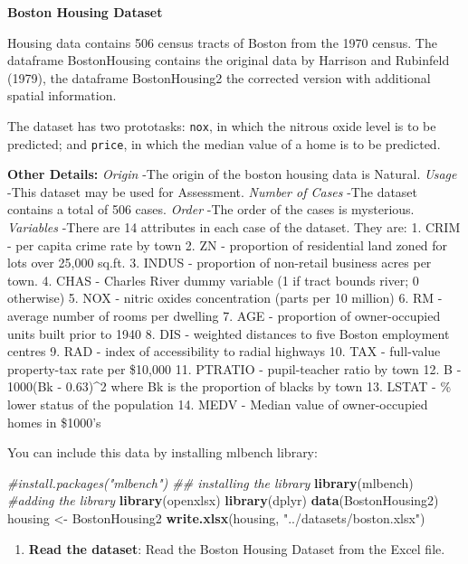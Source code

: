 \documentclass[
]{book}
\newenvironment{Shaded}{\begin{snugshade}}{\end{snugshade}}
\newcommand{\CommentTok}[1]{\textcolor[rgb]{0.56,0.35,0.01}{\textit{#1}}}
\newcommand{\FunctionTok}[1]{\textcolor[rgb]{0.13,0.29,0.53}{\textbf{#1}}}
\newcommand{\NormalTok}[1]{#1}
\newcommand{\OtherTok}[1]{\textcolor[rgb]{0.56,0.35,0.01}{#1}}
\newcommand{\StringTok}[1]{\textcolor[rgb]{0.31,0.60,0.02}{#1}}
\providecommand{\tightlist}{%
  \setlength{\itemsep}{0pt}\setlength{\parskip}{0pt}}
\begin{document}
\textbf{Boston Housing Dataset}

Housing data contains 506 census tracts of Boston from the 1970 census. The dataframe BostonHousing contains the original data by Harrison and Rubinfeld (1979), the dataframe BostonHousing2 the corrected version with additional spatial information.

The dataset has two prototasks: \texttt{nox}, in which the nitrous oxide level is to be predicted; and \texttt{price}, in which the median value of a home is to be predicted.

\textbf{Other Details:}
\emph{Origin}
-The origin of the boston housing data is Natural.
\emph{Usage}
-This dataset may be used for Assessment.
\emph{Number of Cases}
-The dataset contains a total of 506 cases.
\emph{Order}
-The order of the cases is mysterious.
\emph{Variables}
-There are 14 attributes in each case of the dataset. They are:
1. CRIM - per capita crime rate by town
2. ZN - proportion of residential land zoned for lots over 25,000 sq.ft.
3. INDUS - proportion of non-retail business acres per town.
4. CHAS - Charles River dummy variable (1 if tract bounds river; 0 otherwise)
5. NOX - nitric oxides concentration (parts per 10 million)
6. RM - average number of rooms per dwelling
7. AGE - proportion of owner-occupied units built prior to 1940
8. DIS - weighted distances to five Boston employment centres
9. RAD - index of accessibility to radial highways
10. TAX - full-value property-tax rate per \$10,000
11. PTRATIO - pupil-teacher ratio by town
12. B - 1000(Bk - 0.63)\^{}2 where Bk is the proportion of blacks by town
13. LSTAT - \% lower status of the population
14. MEDV - Median value of owner-occupied homes in \$1000's

You can include this data by installing mlbench library:

\begin{Shaded}
\begin{Highlighting}[]
\CommentTok{\#install.packages("mlbench") \#\# installing the library}
\FunctionTok{library}\NormalTok{(mlbench) }\CommentTok{\#adding the library}
\FunctionTok{library}\NormalTok{(openxlsx)}
\FunctionTok{library}\NormalTok{(dplyr)}
\FunctionTok{data}\NormalTok{(BostonHousing2)}
\NormalTok{housing }\OtherTok{\textless{}{-}}\NormalTok{ BostonHousing2}
\FunctionTok{write.xlsx}\NormalTok{(housing, }\StringTok{"../datasets/boston.xlsx"}\NormalTok{)}
\end{Highlighting}
\end{Shaded}

\begin{enumerate}
\def\labelenumi{\arabic{enumi}.}
\tightlist
\item
  \textbf{Read the dataset}: Read the Boston Housing Dataset from the Excel file.
\end{enumerate}
\end{document}

